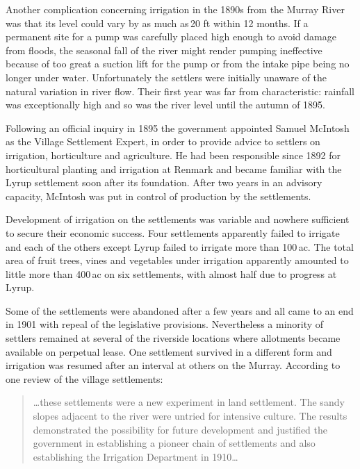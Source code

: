 Another complication concerning irrigation in the 1890s from the
Murray River was that its level could vary by as much as\,20 ft within
12 months.  If a permanent site for a pump was carefully placed high
enough to avoid damage from floods, the seasonal fall of the river
might render pumping ineffective because of too great a suction lift
for the pump or from the intake pipe being no longer under water.
Unfortunately the settlers were initially unaware of the natural
variation in river flow.  Their first year was far from
characteristic: rainfall was exceptionally high and so was the river
level until the autumn of 1895.

Following an official inquiry in 1895 the government appointed Samuel
McIntosh as the Village Settlement Expert, in order to provide advice
to settlers on irrigation, horticulture and agriculture. He had been
responsible since 1892 for horticultural planting and irrigation at
Renmark and became familiar with the Lyrup settlement soon after its
foundation.  After two years in an advisory capacity, McIntosh was put
in control of production by the settlements.

Development of irrigation on the settlements was variable and nowhere
sufficient to secure their economic success.  Four settlements
apparently failed to irrigate and each of the others except Lyrup
failed to irrigate more than 100\,ac. The total area of fruit trees,
vines and vegetables under irrigation apparently amounted to little
more than 400\,ac on six settlements, with almost half due to progress
at Lyrup.

Some of the settlements were abandoned after a few years and all came
to an end in 1901 with repeal of the legislative provisions.
Nevertheless a minority of settlers remained at several of the
riverside locations where allotments became available on perpetual
lease.  One settlement survived in a different form and irrigation was
resumed after an interval at others on the Murray.  According to one
review of the village settlements:
\begin{quote}
	\ldots these settlements were a new experiment in land
	settlement.  The sandy slopes adjacent to the river were
	untried for intensive culture.  The results demonstrated the
	possibility for future development and justified the
	government in establishing a pioneer chain of settlements and
	also establishing the Irrigation Department in
	1910\ldots{}
\end{quote}

